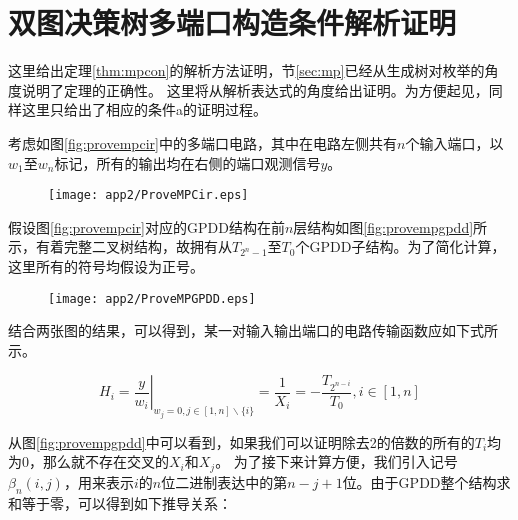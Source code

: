 
\chapter{双图决策树多端口构造条件解析证明}
\label{app:mpcon}

这里给出定理\ref{thm:mpcon}的解析方法证明，节\ref{sec:mp}已经从生成树对枚举的角度说明了定理的正确性。
这里将从解析表达式的角度给出证明。为方便起见，同样这里只给出了相应的条件a的证明过程。

考虑如图\ref{fig:provempcir}中的多端口电路，其中在电路左侧共有$n$个输入端口，以$w_1$至$w_n$标记，所有的输出均在右侧的端口观测信号$y$。

\begin{figure}[!htp]
	\centering
	\texttt{[image: app2/ProveMPCir.eps]}
\end{figure}

假设图\ref{fig:provempcir}对应的GPDD结构在前$n$层结构如图\ref{fig:provempgpdd}所示，有着完整二叉树结构，故拥有从$T_{2^n-1}$至$T_0$个GPDD子结构。为了简化计算，这里所有的符号均假设为正号。

\begin{figure}[!htp]
	\centering
	\texttt{[image: app2/ProveMPGPDD.eps]}
\end{figure}

结合两张图的结果，可以得到，某一对输入输出端口的电路传输函数应如下式所示。

\begin{equation}
{H_i} = {\left. {\frac{y}
		{{{w_i}}}} \right|_{{w_j} = 0,j \in [1,n]\backslash \{ i\} }} = \frac{1}
{{{X_i}}} =  - \frac{{{T_{{2^{n - i}}}}}}
{{{T_0}}},i \in [1,n]
\end{equation}

从图\ref{fig:provempgpdd}中可以看到，如果我们可以证明除去2的倍数的所有的$T_i$均为0，那么就不存在交叉的$X_i$和$X_j$。
为了接下来计算方便，我们引入记号$\beta_n\left(i,j\right)$，用来表示$i$的$n$位二进制表达中的第$n-j+1$位。由于GPDD整个结构求和等于零，可以得到如下推导关系：

